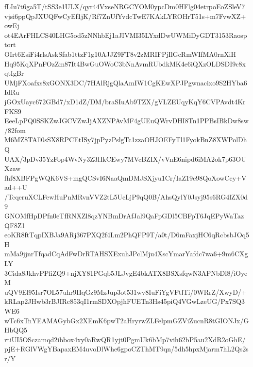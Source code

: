 fLIu7t6ga5T/tSS3e1ULX/qyr44VxseNRGCYOM0ypcDm0HFlg04etrpoEoZSleV7
vjsi6ppQpJXUQFwCyEf1jK/Rf7ZnUfYvdcTwE7KAkLYROHrT51s+m7FvwXZ+owEj
ot4EArFHLCS40LHG5od5zNNhbEj1aJIVMI35LYxdDwUWMiDyGDT3153Raosptort
OIrt6EsiFi4rlsAskSfab1ttzF1g10AJJZ9FT8v2zMRIFPjIlGcRmWIfMA0rnXiH
Hq95KqXPnFOzZm87It4BwGuOWoC3bNnAvmRUbdkMK4e6iQXzOLDSDI9c8xqtIgBr
UMjFXoafxs8xGONX3DC/7HAlRjgQlaAmIW1CgKEwXPJPgwnacixo9S2HYba6IdRu
jGOxUayc672GBd7/xD1dZ/DM/braSIuAb9TZX/gVLZEUqyKqY6CVPAvdt4KrFKS9
EeeLpPQ0SSKZwJGCVZwJjAXZNPAvMF4gUEuQWrvDHI8Tn1PPBsIBkDw8sw/82fom
M6MZ8TAll0sSX8RPCEtISy7jpPyzPslgTc1zzaOHJOEFyTl1FyokBnZ8XWPolDhQ
UAX/3pDv35YzFop4WvNy3Z3HkCEwy7MVcBZIX/vVnE6nipd6iMA2ok7p63OUXzaw
fhf8XBFPgWQK6VS+mgQCSvI6NaaQmDMJSXjyu1Cr/IaZ19e98QoXowCey+Vad++U
/TcqeruXCLFewHuPnMRvnVVZ2tL5UcLjP9qQ0B/AhsQylY0Jsyj95s6RG4lZX0d9
GNOMfHpDPfn0eTfRNXZl8qzYNBmDrAfJal9QaFpGDl5CBFpT6JqEPyWaTazQF8Z1
eoKR8ftTqpIXBJa9ARj367PXQ2f4Lm2PhQFP9T/a0t/D6mFaxjHC6qRcbsbJOq5H
mMa9jjnrTfqadCqAdFwDrRTAHSXExuhJPclMju4XscYmarYafdc7wa6+9m6CXgLY
3Cida8JkhvPPfiZQ9+njXY81PGqb5JLJvgE4bkATX8BSXsfqwN3APNbDl8/iOyeM
uQV9El95Isr7OL57uhr9HqGz9MzJup3ot531wv8IuFiYgVFtlTi/0WRrZ/XwyD/+
kRLap2JHwb3rBJIRc853qI1rmSDXOpjhFUETn3Hs45piQ4VGwLzeUG/Px7SQ3WE6
wTc6xTnYEAMAGybGx2XEmK6pwT2aHryrwZLFelpmGZViZucnR8tGIONJx/GHbQQ5
rtiUI5OSczamqd2ibbox4xy0aRwQR1yjt0PgmUk6bMp7vih62bP5au2XdR2oGhE/
pjE+RGlVWgYBapaxEM4uvoDlWhe6gpoCZThMT9qn/5dh5hpxMjarm7hL2Qs2sr/Y
